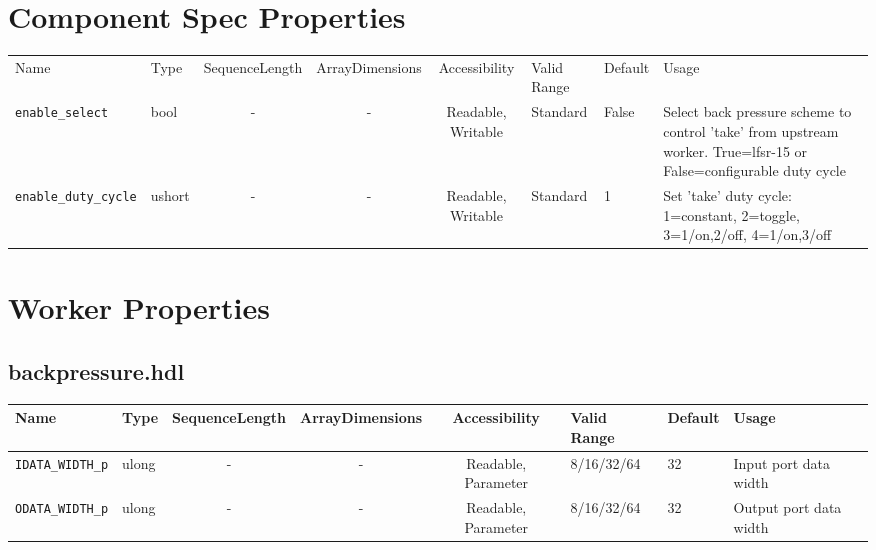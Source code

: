 \documentclass{article}
\def\comp{backpressure}
\begin{document}
\begin{landscape}
	\section*{Component Spec Properties}
	\begin{scriptsize}
		\begin{tabular}{|p{2cm}|p{1.5cm}|c|c|c|p{1.5cm}|p{1cm}|p{7cm}|}
			\hline
			\rowcolor{blue}
			Name                 & Type   & SequenceLength & ArrayDimensions & Accessibility       & Valid Range & Default & Usage                                                 \\
			\verb+enable_select+     & bool & -              & -               & Readable, Writable  & Standard    & False       & Select back pressure scheme to control 'take' from upstream worker. True=lfsr-15 or False=configurable duty cycle \\
			\hline
			\verb+enable_duty_cycle+   & ushort & -              & -               & Readable, Writable  & Standard    & 1    & Set 'take' duty cycle: 1=constant, 2=toggle, 3=1/on,2/off, 4=1/on,3/off \\
			\hline
		\end{tabular}
	\end{scriptsize}

	\section*{Worker Properties}
	\subsection*{\comp.hdl}
	\begin{scriptsize}
		\begin{tabular}{|p{2cm}|p{1.5cm}|c|c|c|p{1.5cm}|p{1cm}|p{7cm}|}
			\hline
			\rowcolor{blue}
			Name                      & Type  & SequenceLength & ArrayDimensions & Accessibility       & Valid Range & Default & Usage                                      \\
			\hline
			\verb+IDATA_WIDTH_p+ & ulong  & -              & -               & Readable, Parameter & 8/16/32/64  & 32      & Input port data width                                 \\
			\hline
			\verb+ODATA_WIDTH_p+ & ulong  & -              & -               & Readable, Parameter & 8/16/32/64  & 32      & Output port data width                                \\
			\hline
		\end{tabular}
	\end{scriptsize}


\end{landscape}
\end{document}
